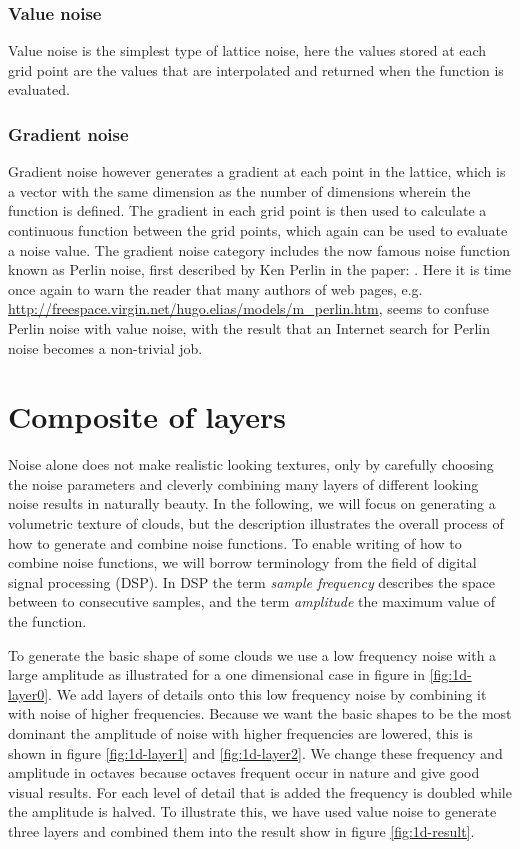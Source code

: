 \subsubsection{Value noise}
Value noise is the simplest type of lattice noise, here the values
stored at each grid point are the values that are interpolated and
returned when the function is evaluated.

\subsubsection{Gradient noise}
Gradient noise however generates a gradient at each point in the
lattice, which is a vector with the same dimension as the number of
dimensions wherein the function is defined. The gradient in each grid
point is then used to calculate a continuous function between the grid
points, which again can be used to evaluate a noise value.
%
The gradient noise category includes the now famous noise
function known as Perlin noise, first described by Ken Perlin in
the paper: .
%
Here it is time once again to warn the reader that many authors of web
pages,
e.g. \url{http://freespace.virgin.net/hugo.elias/models/m_perlin.htm},
seems to confuse Perlin noise with value noise, with the result that
an Internet search for Perlin noise becomes a non-trivial job.

\section{Composite of layers}
Noise alone does not make realistic looking textures, only by carefully
choosing the noise parameters and cleverly combining many layers of
different looking noise results in naturally beauty. In the following,
we will focus on generating a volumetric texture of clouds, but the
description illustrates the overall process of how to generate and
combine noise functions.
%
To enable writing of how to combine noise functions, we will borrow
terminology from the field of digital signal processing (DSP).
In DSP the term \emph{sample frequency}
describes the space between to consecutive samples, and the term
\emph{amplitude} the maximum value of the function.

To generate the basic shape of some clouds we use a low
frequency noise with a large amplitude as illustrated for a one
dimensional case in figure in \ref{fig:1d-layer0}.
%
We add layers of details onto this low frequency noise by combining it 
with noise of higher frequencies.
Because we want the basic shapes to be the most
dominant the amplitude of noise with higher frequencies are lowered,
this is shown in figure \ref{fig:1d-layer1} and \ref{fig:1d-layer2}.
%
We change these frequency and amplitude in octaves because
octaves frequent occur in nature and give good visual results.
For each level of detail that is added the frequency is doubled while
the amplitude is halved. To illustrate this, we have used value noise
to generate three layers and combined them into the result show in
figure \ref{fig:1d-result}.


